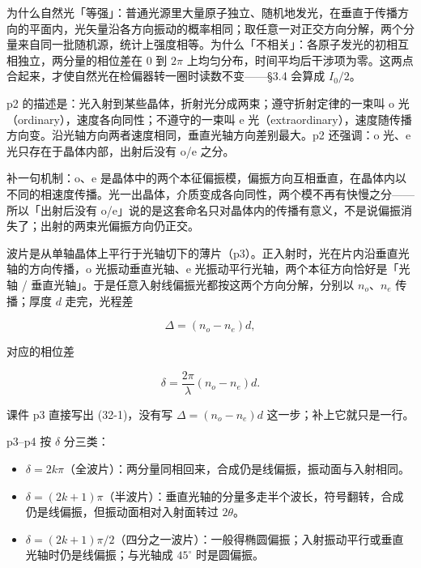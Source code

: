 \documentclass[11pt]{ctexart}
\begin{document}

为什么自然光「等强」：普通光源里大量原子独立、随机地发光，在垂直于传播方向的平面内，光矢量沿各方向振动的概率相同；取任意一对正交方向分解，两个分量来自同一批随机源，统计上强度相等。为什么「不相关」：各原子发光的初相互相独立，两分量的相位差在 $0$ 到 $2\pi$ 上均匀分布，时间平均后干涉项为零。这两点合起来，才使自然光在检偏器转一圈时读数不变——§3.4 会算成 $I_0/2$。



p2 的描述是：光入射到某些晶体，折射光分成两束；遵守折射定律的一束叫 o 光（ordinary），速度各向同性；不遵守的一束叫 e 光（extraordinary），速度随传播方向变。沿光轴方向两者速度相同，垂直光轴方向差别最大。p2 还强调：o 光、e 光只存在于晶体内部，出射后没有 o/e 之分。

补一句机制：o、e 是晶体中的两个本征偏振模，偏振方向互相垂直，在晶体内以不同的相速度传播。光一出晶体，介质变成各向同性，两个模不再有快慢之分——所以「出射后没有 o/e」说的是这套命名只对晶体内的传播有意义，不是说偏振消失了；出射的两束光偏振方向仍正交。


波片是从单轴晶体上平行于光轴切下的薄片（p3）。正入射时，光在片内沿垂直光轴的方向传播，o 光振动垂直光轴、e 光振动平行光轴，两个本征方向恰好是「光轴 / 垂直光轴」。于是任意入射线偏振光都按这两个方向分解，分别以 $n_o$、$n_e$ 传播；厚度 $d$ 走完，光程差

\[ \Delta=(n_o-n_e)d, \]

对应的相位差

\[ \delta=\frac{2\pi}{\lambda}(n_o-n_e)d. \]


课件 p3 直接写出 (32-1)，没有写 $\Delta=(n_o-n_e)d$ 这一步；补上它就只是一行。


p3--p4 按 $\delta$ 分三类：

\begin{itemize}
\item $\delta=2k\pi$（全波片）：两分量同相回来，合成仍是线偏振，振动面与入射相同。
\item $\delta=(2k+1)\pi$（半波片）：垂直光轴的分量多走半个波长，符号翻转，合成仍是线偏振，但振动面相对入射面转过 $2\theta$。
\item $\delta=(2k+1)\pi/2$（四分之一波片）：一般得椭圆偏振；入射振动平行或垂直光轴时仍是线偏振；与光轴成 $45^\circ$ 时是圆偏振。
\end{itemize}
\end{document}
